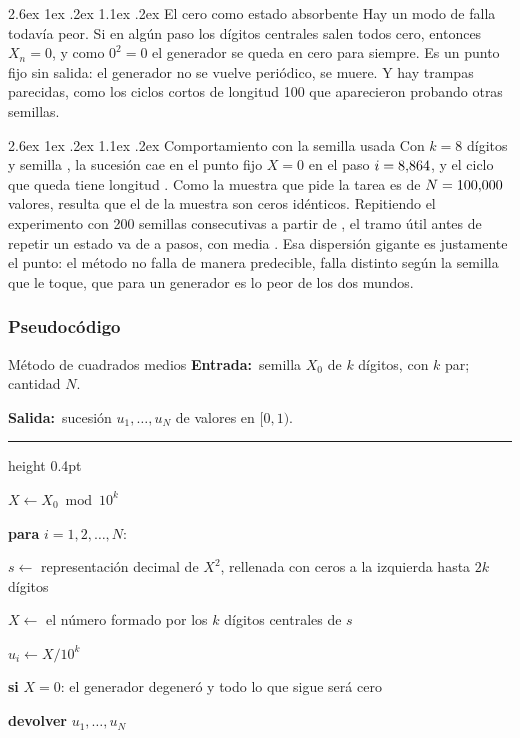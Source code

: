 \documentclass[11pt,letterpaper]{article}
\makeatletter
\renewcommand\paragraph{\@startsection{paragraph}{4}{\z@}%
  {2.6ex \@plus 1ex \@minus .2ex}%
  {1.1ex \@plus .2ex}%
  {\normalfont\normalsize\bfseries}}
\newcommand{\entrada}[1]{\textbf{\small Entrada:}\ \small #1\par}
\newcommand{\salida}[1]{\textbf{\small Salida:}\ \small #1\par
  \vspace{3pt}\textcolor{marco}{\hrule height 0.4pt}\vspace{5pt}}
\makeatother
\begin{document}
\paragraph{El cero como estado absorbente} Hay un modo de falla todavía
peor. Si en algún paso los dígitos centrales salen todos cero, entonces
$X_n = 0$, y como $0^2 = 0$ el generador se queda en cero para siempre. Es un
punto fijo sin salida: el generador no se vuelve periódico, se muere. Y hay
trampas parecidas, como los ciclos cortos de longitud 100 que aparecieron
probando otras semillas.

\paragraph{Comportamiento con la semilla usada} Con $k = 8$ dígitos y semilla
\Semilla, la sucesión cae en el punto fijo $X = 0$ en el paso
$i = 8{,}864$, y el ciclo que queda tiene longitud \CMCiclo. Como la
muestra que pide la tarea es de $N = 100{,}000$ valores, resulta que el
\CMFracCeros{} de la muestra son ceros idénticos. Repitiendo el experimento
con 200 semillas consecutivas a partir de \Semilla, el tramo útil antes de
repetir un estado va de \CMLargoMin{} a \CMLargoMax{} pasos, con media
\CMLargoMedio. Esa dispersión gigante es justamente el punto: el método no
falla de manera predecible, falla distinto según la semilla que le toque, que
para un generador es lo peor de los dos mundos.

\subsubsection{Pseudocódigo}

\begin{pseudo}{Método de cuadrados medios}
\entrada{semilla $X_0$ de $k$ dígitos, con $k$ par; cantidad $N$.}
\salida{sucesión $u_1,\dots,u_N$ de valores en $[0,1)$.}
\begin{pasos}
  \item $X \gets X_0 \bmod 10^{k}$
  \item \textbf{para} $i = 1, 2, \dots, N$:
  \begin{pasos}
     \item $s \gets$ representación decimal de $X^2$, rellenada con ceros a la izquierda hasta $2k$ dígitos
     \item $X \gets$ el número formado por los $k$ dígitos centrales de $s$
     \item $u_i \gets X / 10^{k}$
     \item \textbf{si} $X = 0$: el generador degeneró y todo lo que sigue será cero
  \end{pasos}
  \item \textbf{devolver} $u_1, \dots, u_N$
\end{pasos}
\end{pseudo}
\end{document}
